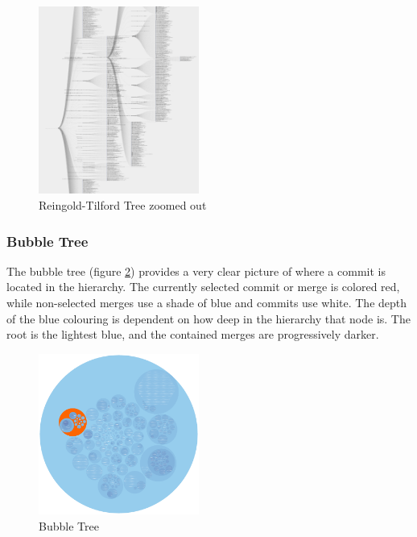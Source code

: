 \documentclass[conference, draftclsnofoot, draft]{IEEEtran}
\begin{document}
\begin{figure}
        \centering
        \includegraphics[width=0.47\textwidth]{figures/tree_zoom.png}
        \caption{Reingold-Tilford Tree zoomed out}
        \label{fig:zoomed_tree}
\end{figure}

\subsubsection{Bubble Tree}

The bubble tree (figure \ref{fig:bubble_tree}) provides a very clear picture of
where a commit is located in the hierarchy. The currently selected commit or merge
is colored red, while non-selected merges use a shade of blue and commits use white.
The depth of the blue colouring is dependent on how deep in the hierarchy that node
is. The root is the lightest blue, and the contained merges are progressively
darker.

\begin{figure}
        \centering
        \includegraphics[width=0.47\textwidth]{figures/bubble_tree.pdf}
        \caption{Bubble Tree}
        \label{fig:bubble_tree}
\end{figure}
\end{document}
